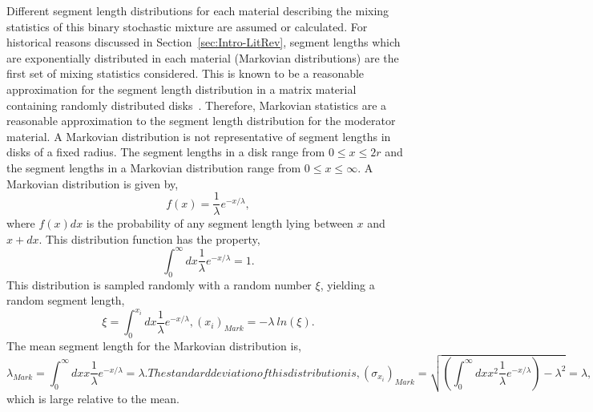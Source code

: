 \noindent
	\indent Different segment length distributions for each material describing the mixing statistics of this 
	binary stochastic mixture are assumed or calculated.  For historical reasons discussed in
	Section~\ref{sec:Intro-LitRev}, segment lengths which are exponentially distributed in each
	material (Markovian distributions) are the first set of mixing statistics considered.  This is known to be a
	reasonable approximation for the segment length distribution in a matrix material containing randomly
	distributed disks~\cite{Ols:03}.  Therefore, Markovian statistics are a reasonable approximation to the
	segment length distribution for the moderator material.
	A Markovian distribution is not representative of segment lengths in disks of a fixed radius.  The
	segment lengths in a disk range from ${0 \le x \le 2r}$ and the segment lengths in a Markovian distribution
	range from ${0 \le x \le \infty}$.  A Markovian distribution is given by,
	\begin{equation}
		f(x) = \frac{1}{\lambda}e^{-x/\lambda},
	\end{equation}
	where ${f(x)}dx$ is the probability of any segment length lying between ${x}$ and ${x+dx}$.  This
	distribution function has the property, 
	\begin{equation}
		\int_{0}^{\infty} dx\frac{1}{\lambda}e^{-x/\lambda} = 1.
	\end{equation}
	This distribution is sampled randomly with a random number ${\xi}$, yielding a random segment length,
	\begin{subequations}
		\begin{equation}
			\xi = \int_{0}^{x_i} dx\frac{1}{\lambda}e^{-x/\lambda},
		\end{equation}
		\begin{equation}
			\left(x_i\right)_{Mark} = -\lambda \ ln(\xi).
		\end{equation}
	\end{subequations}
	The mean segment length for the Markovian distribution is,
	\begin{subequations}
		\begin{equation}
			\lambda_{Mark} = \int_{0}^{\infty} dxx\frac{1}{\lambda}e^{-x/\lambda} = \lambda.
		\end{equation}
	The standard deviation of this distribution is,
		\begin{equation}
			\left({\sigma_{x_i}}\right)_{Mark} = \sqrt{\left(\int_{0}^{\infty} dxx^2\frac{1}{\lambda}e^{-x/\lambda}
			\right)- \lambda^2} = \lambda,
		\end{equation}
	\end{subequations}
	which is large relative to the mean.
	
